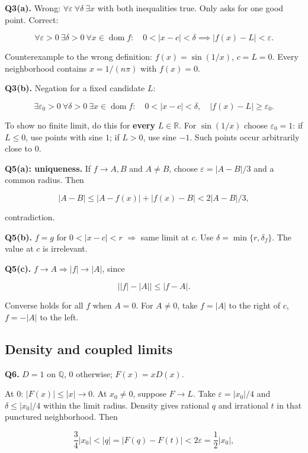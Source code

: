 \documentclass[11pt,a4paper]{article}
\begin{document}
\textbf{Q3(a).} Wrong: \(\forall\varepsilon\ \forall\delta\ \exists x\)
with both inequalities true. Only asks for one good point. Correct:

\[
\forall\varepsilon>0\ \exists\delta>0\ \forall x\in\operatorname{dom}f:
\quad 0<|x-c|<\delta\implies |f(x)-L|<\varepsilon.
\]

Counterexample to the wrong definition: \(f(x)=\sin(1/x)\), \(c=L=0\).
Every neighborhood contains \(x=1/(n\pi)\) with \(f(x)=0\).

\textbf{Q3(b).} Negation for a fixed candidate \(L\):

\[
\exists\varepsilon_0>0\ \forall\delta>0\ \exists x\in\operatorname{dom}f:
\quad 0<|x-c|<\delta,\quad |f(x)-L|\ge\varepsilon_0.
\]

To show no finite limit, do this for \textbf{every} \(L\in\mathbb R\).
For \(\sin(1/x)\) choose \(\varepsilon_0=1\): if \(L\le0\), use points
with sine \(1\); if \(L>0\), use sine \(-1\). Such points occur
arbitrarily close to \(0\).

\textbf{Q5(a): uniqueness.} If \(f\to A,B\) and \(A\ne B\), choose
\(\varepsilon=|A-B|/3\) and a common radius. Then

\[
|A-B|\le|A-f(x)|+|f(x)-B|<2|A-B|/3,
\]

contradiction.

\textbf{Q5(b).} \(f=g\) for \(0<|x-c|<r\) \(\Rightarrow\) same limit at
\(c\). Use \(\delta=\min\{r,\delta_f\}\). The value at \(c\) is
irrelevant.

\textbf{Q5(c).} \(f\to A\Rightarrow|f|\to|A|\), since

\[
\bigl||f|-|A|\bigr|\le|f-A|.
\]

Converse holds for all \(f\) when \(A=0\). For \(A\ne0\), take \(f=|A|\)
to the right of \(c\), \(f=-|A|\) to the left.

\subsection{Density and coupled
limits}\label{density-and-coupled-limits}

\textbf{Q6.} \(D=1\) on \(\mathbb Q\), \(0\) otherwise; \(F(x)=xD(x)\).

At \(0\): \(|F(x)|\le|x|\to0\). At \(x_0\ne0\), suppose \(F\to L\). Take
\(\varepsilon=|x_0|/4\) and \(\delta\le|x_0|/4\) within the limit
radius. Density gives rational \(q\) and irrational \(t\) in that
punctured neighborhood. Then

\[
\frac34|x_0|<|q|=|F(q)-F(t)|<2\varepsilon=\frac12|x_0|,
\]
\end{document}
